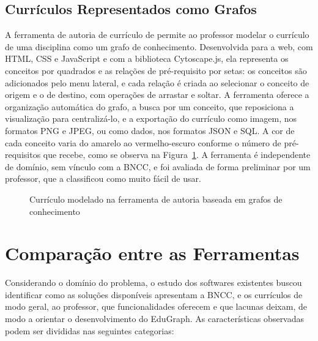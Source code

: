 \subsection{Currículos Representados como Grafos}
\label{sec-referencial-softwares-grafos}

A ferramenta de autoria de currículo de  permite ao professor modelar o currículo de uma disciplina como um grafo de conhecimento. Desenvolvida para a web, com HTML, CSS e JavaScript e com a biblioteca Cytoscape.js, ela representa os conceitos por quadrados e as relações de pré-requisito por setas: os conceitos são adicionados pelo menu lateral, e cada relação é criada ao selecionar o conceito de origem e o de destino, com operações de arrastar e soltar. A ferramenta oferece a organização automática do grafo, a busca por um conceito, que reposiciona a visualização para centralizá-lo, e a exportação do currículo como imagem, nos formatos PNG e JPEG, ou como dados, nos formatos JSON e SQL. A cor de cada conceito varia do amarelo ao vermelho-escuro conforme o número de pré-requisitos que recebe, como se observa na Figura~\ref{fig-sw-autoria}. A ferramenta é independente de domínio, sem vínculo com a BNCC, e foi avaliada de forma preliminar por um professor, que a classificou como muito fácil de usar.

\begin{figure}[H]
    \centering
    \caption[Currículo modelado na ferramenta de autoria baseada em grafos de conhecimento]{Currículo modelado na ferramenta de autoria baseada em grafos de conhecimento \protect\cite{silva2025autoria}}
    \label{fig-sw-autoria}
\end{figure}


\section{Comparação entre as Ferramentas}
\label{sec-referencial-comparacao}

Considerando o domínio do problema, o estudo dos softwares existentes buscou identificar como as soluções disponíveis apresentam a BNCC, e os currículos de modo geral, ao professor, que funcionalidades oferecem e que lacunas deixam, de modo a orientar o desenvolvimento do EduGraph. As características observadas podem ser divididas nas seguintes categorias:

